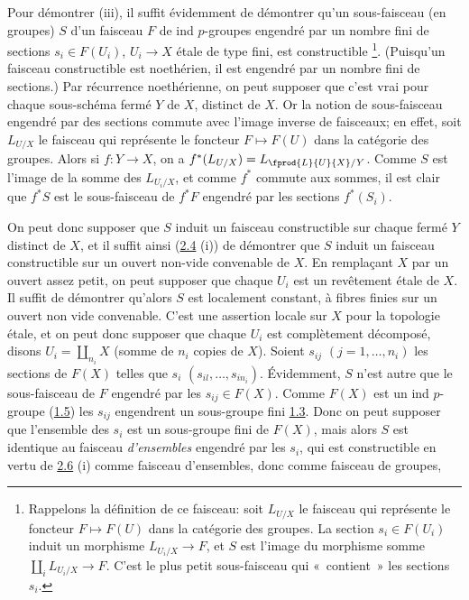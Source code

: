 \documentclass[10pt]{../fichiers-configuration-latex/smfart}
\begin{document}
Pour démontrer (iii), il suffit évidemment de démontrer qu'un
sous-faisceau (en groupes) $S$ d'un faisceau $F$ de ind $p$-groupes
engendré par un nombre fini de sections $s_i\in F(U_i)$,
$U_i\rightarrow X$ étale de type fini, est constructible
\footnote[1]{Rappelons la définition de ce faisceau: soit $L_{U/X}$
le faisceau qui représente le foncteur $F\mapsto F(U)$ dans la
catégorie des groupes. La section $s_i\in F(U_i)$ induit un morphisme
$L_{U_i/X}\rightarrow F$, et $S$ est l'image du morphisme somme
$\amalg_i L_{U_i/X}\rightarrow F$. C'est le plus petit sous-faisceau
qui « contient » les sections $s_i$.}. (Puisqu'un\pageoriginale
faisceau constructible est noethérien, il est engendré par un nombre
fini de sections.) Par récurrence noethérienne, on peut supposer que
c'est vrai pour chaque sous-schéma fermé $Y$ de $X$, distinct de
$X$. Or la notion de sous-faisceau engendré par des sections commute
avec l'image inverse de faisceaux; en effet, soit $L_{U/X}$ le
faisceau qui représente le foncteur $F\mapsto F(U)$ dans la catégorie
des groupes. Alors si $f:Y\rightarrow X$, on a
$f^{\ast}(L_{U/X})=L_{\fprod{L}{U}{X}/Y}$. Comme $S$ est l'image de la
somme des $L_{U_i/X}$, et comme $f^{\ast}$ commute aux sommes, il est
clair que $f^{\ast}S$ est le sous-faisceau de $f^{\ast}F$ engendré par
les sections $f^{\ast}(S_i)$.

On peut donc supposer que $S$ induit un faisceau constructible sur
chaque fermé $Y$ distinct de $X$, et il suffit ainsi (\hyperref[IX.prop2.4]{2.4} (i)) de
démontrer que $S$ induit un faisceau constructible sur un ouvert
non-vide convenable de $X$. En remplaçant $X$ par un ouvert assez
petit, on peut supposer que chaque $U_i$ est un revêtement étale de
$X$. Il suffit de démontrer qu'alors $S$ est localement constant, à
fibres finies sur un ouvert non vide convenable. C'est une assertion
locale sur $X$ pour la topologie étale, et on peut donc supposer que
chaque $U_i$ est complètement décomposé, disons $U_i=\amalg_{n_i}X$
(somme de $n_i$ copies de $X$). Soient $s_{ij}$ $(j=1,\ldots,n_i)$ les
sections de $F(X)$ telles que
$s_i$ $(s_{il},\ldots,s_{in_i})$. Évidemment, $S$ n'est autre que le
sous-faisceau de $F$ engendré par les $s_{ij}\in F(X)$. Comme $F(X)$
est un ind $p$-groupe (\hyperref[IX.def1.5]{1.5}) les $s_{ij}$ engendrent un sous-groupe
fini \hyperref[IX.def1.3]{1.3}. Donc on peut supposer que l'ensemble des $s_i$ est un
sous-groupe fini de $F(X)$, mais alors $S$ est identique au faisceau
\emph{d'ensembles} engendré par les $s_i$, qui est constructible en
vertu de \hyperref[IX.prop2.6]{2.6} (i) comme faisceau d'ensembles, donc comme faisceau de
groupes, \cqfd
\end{document}
